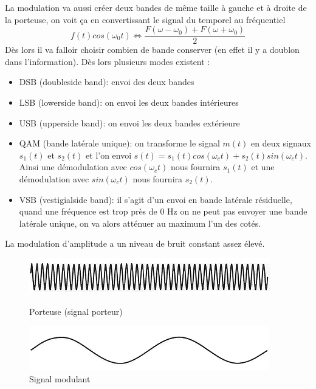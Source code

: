 La modulation va aussi créer deux bandes de même taille à gauche et à droite de la porteuse, on voit ça en convertissant le signal du temporel au fréquentiel $$f(t) cos(\omega_0 t) \Leftrightarrow \frac{F(\omega - \omega_0) + F(\omega + \omega_0)}{2}$$ Dès lors il va falloir choisir combien de bande conserver (en effet il y a doublon dans l'information). Dès lors plusieurs modes existent :

\begin{itemize}
\item DSB (doubleside band): envoi des deux bandes
\item LSB (lowerside band): on envoi les deux bandes intérieures
\item USB (upperside band): on envoi les deux bandes extérieure
\item QAM (bande latérale unique): on transforme le signal $m(t)$ en
    deux signaux $s_1(t)$ et $s_2(t)$ et l'on envoi $s(t) = s_1(t) cos(\omega_c t) + s_2(t) sin(\omega_c t)$. Ainsi une démodulation avec $cos(\omega_c t)$ nous fournira $s_1(t)$ et une démodulation avec $sin(\omega_c t)$ nous fournira $s_2(t)$. 
\item VSB (vestigialside band): il s'agit d'un envoi en bande latérale résiduelle, quand une fréquence est trop près de 0 Hz on ne peut pas envoyer une bande latérale unique, on va alors atténuer au maximum l'un des cotés.
\end{itemize}

La modulation d'amplitude a un niveau de bruit constant assez élevé. 

\begin{figure}[H]
    \centering
    \begin{minipage}[t]{0.45\linewidth}
        \centering
        \includegraphics[width=0.75\linewidth]{img/signal_porteur.png}
        \caption{Porteuse (signal porteur)}
    \end{minipage}
    \begin{minipage}[t]{0.45\linewidth}
        \centering
        \includegraphics[width=0.75\linewidth]{img/signal_modulant.png}
        \caption{Signal modulant}
    \end{minipage}
\end{figure}

